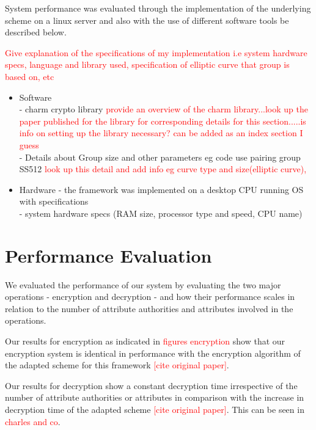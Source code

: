 System performance was evaluated through the implementation of the underlying scheme on a linux server and also with the use of different software tools be described below.

\textcolor{red}{Give explanation of the specifications of my implementation i.e system hardware specs, language and library used, specification of elliptic curve that group is based on, etc}

\begin{itemize}
	\item Software
	\\- charm crypto library  \textcolor{red}{provide an overview of the charm library...look up the paper published for the library for corresponding details for this section.....is info on setting up the library necessary? can be added as an index section I guess}
	\\- Details about Group size and other parameters eg code use pairing group SS512 \textcolor{red}{look up this detail and add info eg curve type and size(elliptic curve),}
	
	\item Hardware - the framework was implemented on a desktop CPU running  OS with specifications
	\\- system hardware specs (RAM size, processor type and speed, CPU name)
\end{itemize}


\section{Performance Evaluation}

We evaluated the performance of our system by evaluating the two major operations - encryption and decryption - and how their performance scales in relation to the number of attribute authorities and attributes involved in the operations.

Our results for encryption as indicated in \textcolor{red}{figures encryption} show that our encryption system is identical in performance with the encryption algorithm of the adapted scheme for this framework \textcolor{red}{[cite original paper]}.

Our results for decryption show a constant decryption time irrespective of the number of attribute authorities or attributes in comparison with the increase in decryption time of the adapted scheme \textcolor{red}{[cite original paper]}. This can be seen in \textcolor{red}{charles and co}.

